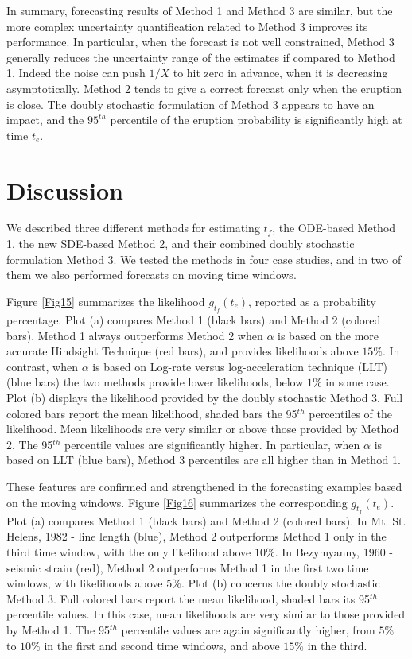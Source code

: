 \documentclass{article}
\begin{document}
In summary, forecasting results of Method 1 and Method 3 are similar, but the more complex uncertainty quantification related to Method 3 improves its performance. In particular, when the forecast is not well constrained, Method 3 generally reduces the uncertainty range of the estimates if compared to Method 1. Indeed the noise can push $1/X$ to hit zero in advance, when it is decreasing asymptotically. Method 2 tends to give a correct forecast only when the eruption is close. The doubly stochastic formulation of Method 3 appears to have an impact, and the $95^{th}$ percentile of the eruption probability is significantly high at time $t_e$.

\section{Discussion}\label{s6}
We described three different methods for estimating $t_f$, the ODE-based Method 1, the new SDE-based Method 2, and their combined doubly stochastic formulation Method 3. We tested the methods in four case studies, and in two of them we also performed forecasts on moving time windows.

Figure \ref{Fig15} summarizes the likelihood $g_{t_f}(t_e)$, reported as a probability percentage. Plot (a) compares Method 1 (black bars) and Method 2 (colored bars). Method 1 always outperforms Method 2 when $\alpha$ is based on the more accurate Hindsight Technique (red bars), and provides likelihoods above $15\%$. In contrast, when $\alpha$ is based on Log-rate versus log-acceleration technique (LLT) (blue bars) the two methods provide lower likelihoods, below $1\%$ in some case. Plot (b) displays the likelihood provided by the doubly stochastic Method 3. Full colored bars report the mean likelihood, shaded bars the 95$^{th}$ percentiles of the likelihood. Mean likelihoods are very similar or above those provided by Method 2. The 95$^{th}$ percentile values are significantly higher. In particular, when $\alpha$ is based on LLT (blue bars), Method 3 percentiles are all higher than in Method 1.

These features are confirmed and strengthened in the forecasting examples based on the moving windows. Figure \ref{Fig16} summarizes the corresponding $g_{t_f}(t_e)$. Plot (a) compares Method 1 (black bars) and Method 2 (colored bars). In Mt. St. Helens, 1982 - line length (blue), Method 2 outperforms Method 1 only in the third time window, with the only likelihood above $10\%$. In Bezymyanny, 1960 - seismic strain (red), Method 2 outperforms Method 1 in the first two time windows, with likelihoods above $5\%$. Plot (b) concerns the doubly stochastic Method 3. Full colored bars report the mean likelihood, shaded bars its 95$^{th}$ percentile values. In this case, mean likelihoods are very similar to those provided by Method 1. The 95$^{th}$ percentile values are again significantly higher, from $5\%$ to $10\%$ in the first and second time windows, and above $15\%$ in the third.
\end{document}
